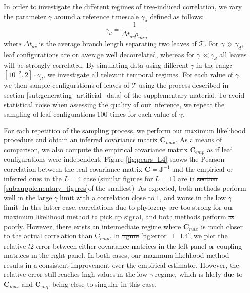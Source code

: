 \documentclass[preprint,amsmath,amssymb,superscriptaddress,showpacs,pre]{revtex4-1}
\providecommand{\DIFadd}[1]{{\protect\color{blue}\uwave{#1}}} %
\providecommand{\DIFdel}[1]{{\protect\color{red}\sout{#1}}}                      %
\providecommand{\DIFaddbegin}{} %
\providecommand{\DIFaddend}{} %
\providecommand{\DIFdelbegin}{} %
\providecommand{\DIFdelend}{} %
\newcommand{\DIFscaledelfig}{0.5}
\newlength{\DIFdelgraphicswidth} %
\newlength{\DIFdelgraphicsheight} %
\newcommand{\DIFaddincludegraphics}[2][]{{\color{blue}\fbox{\DIFOincludegraphics[#1]{#2}}}} %
\newcommand{\DIFdelincludegraphics}[2][]{%
\sbox{\DIFdelgraphicsbox}{\DIFOincludegraphics[#1]{#2}}%
\settoboxwidth{\DIFdelgraphicswidth}{\DIFdelgraphicsbox} %
\settoboxtotalheight{\DIFdelgraphicsheight}{\DIFdelgraphicsbox} %
\scalebox{\DIFscaledelfig}{%
\parbox[b]{\DIFdelgraphicswidth}{\usebox{\DIFdelgraphicsbox}\\[-\baselineskip] \rule{\DIFdelgraphicswidth}{0em}}\llap{\resizebox{\DIFdelgraphicswidth}{\DIFdelgraphicsheight}{%
\setlength{\unitlength}{\DIFdelgraphicswidth}%
\begin{picture}(1,1)%
\thicklines\linethickness{2pt} %
{\color[rgb]{1,0,0}\put(0,0){\framebox(1,1){}}}%
{\color[rgb]{1,0,0}\put(0,0){\line( 1,1){1}}}%
{\color[rgb]{1,0,0}\put(0,1){\line(1,-1){1}}}%
\end{picture}%
}\hspace*{3pt}}} %
} %
\DeclareRobustCommand{\DIFaddbegin}{\DIFOaddbegin \let\includegraphics\DIFaddincludegraphics} %
\DeclareRobustCommand{\DIFaddend}{\DIFOaddend \let\includegraphics\DIFOincludegraphics} %
\DeclareRobustCommand{\DIFdelbegin}{\DIFOdelbegin \let\includegraphics\DIFdelincludegraphics} %
\DeclareRobustCommand{\DIFdelend}{\DIFOaddend \let\includegraphics\DIFOincludegraphics} %
\begin{document}
In order to investigate the different regimes of tree-induced correlation, we vary the parameter $\gamma$ around a reference timescale $\gamma_d$ defined as follows: 
\begin{equation}
    \gamma_d = \frac{1}{\Delta t_{av}\rho_{min}} 
\end{equation}
where $\Delta t_{av}$ is the average branch length separating two leaves of $\mathcal{T}$. 
For $\gamma \gg \gamma_d$, leaf configurations are on average well decorrelated, whereas for $\gamma \ll \gamma_d$ all leaves will be strongly correlated. 
By simulating data using different $\gamma$ in the range $[10^{-2},2]\cdot\gamma_d$, we investigate all relevant temporal regimes.  
For each value of $\gamma$, we then sample  configurations of leaves of $\mathcal{T}$ using the process described in section \ref{sub:generating_artificial_data} of the supplementary material. 
To avoid statistical noise when assessing the quality of our inference, we repeat the sampling of leaf configurations 100 times for each value of $\gamma$.

For each repetition of the sampling process, we perform our maximum likelihood procedure and obtain an inferred covariance matrix $\bm{C}_{max}$. 
As a means of comparison, we also compute the empirical covariance matrix $\bm{C}_{emp}$ as if leaf configurations were independent. 
\DIFdelbegin \DIFdel{Figure }\DIFdelend \DIFaddbegin \DIFadd{Fig.~}\DIFaddend \ref{fig:pears_L4} shows the Pearson correlation between the real covariance matrix $\bm{C}=\bm{J}^{-1}$ and the empirical or inferred ones in the $L=4$ case (similar figures for $L=10$ are in \DIFdelbegin \DIFdel{section \ref{sub:supplementary_figures}of the smallest}\DIFdelend \DIFaddbegin \DIFadd{Appendix \ref{sub:supplementary_figures}}\DIFaddend ). 
As expected, both methods perform well in the large $\gamma$ limit with a correlation close to $1$, and worse in the low $\gamma$ limit. 
In this latter case, correlations due to phylogeny are too strong for our maximum likelihood method to pick up signal, and both methods perform \DIFdelbegin \DIFdel{as }\DIFdelend \DIFaddbegin \DIFadd{equally }\DIFaddend poorly. 
However, there exists an intermediate regime where $\bm{C}_{max}$ is much closer to the actual correlation than  $\bm{C}_{emp}$. 
In \DIFdelbegin \DIFdel{figure }\DIFdelend \DIFaddbegin \DIFadd{Fig.~}\DIFaddend \ref{fig:error_1_L4}, we plot the relative $l2$-error between either covariance matrices in the left panel or coupling matrices in the right panel. 
In both cases, our maximum-likelihood method results in a consistent improvement over the empirical estimator. 
However, the relative error still reaches high values in the low $\gamma$ regime, which is likely due to $\bm{C}_{max}$ and $\bm{C}_{emp}$ being close to singular in this case. 
\end{document}
